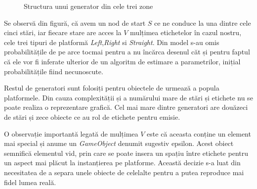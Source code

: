 \vspace{10mm}
\begin{figure}[H]
\centering
{}
\caption{Structura unui generator din cele trei zone}
\end{figure}
\par

Se observă din figură, că avem un nod de start $S$ ce ne conduce la una dintre cele cinci stări, iar fiecare stare are acces la $V$ mulțimea etichetelor în cazul nostru, cele trei tipuri de platformă \textit{Left},\textit{Right} si \textit{Straight}. Din model s-au omis probabilitățile de pe arce tocmai pentru a nu încărca desenul căt și pentru faptul că ele vor fi inferate ulterior de un algoritm de estimare a parametrilor, inițial probabilitățile fiind necunoscute.\par

Restul de generatori sunt folosiți pentru obiectele de urmează a popula platformele. Din cauza complexității și a numărului mare de stări și etichete nu se poate realiza o reprezentare grafică. Cel mai mare dintre generatori are douăzeci de stări și zece obiecte ce au rol de etichete pentru emisie.\par

O observație importantă legată de mulțimea $V$ este că aceasta conține un element mai special și anume un \textit{GameObject} denumit sugestiv epsilon. Acest obiect semnifică elementul vid, prin care se poate insera un spațiu între etichete pentru un aspect mai plăcut la instanțierea pe platforme. Această decizie s-a luat din necesitatea de a separa unele obiecte de celelalte pentru a putea reproduce mai fidel lumea reală.\par

